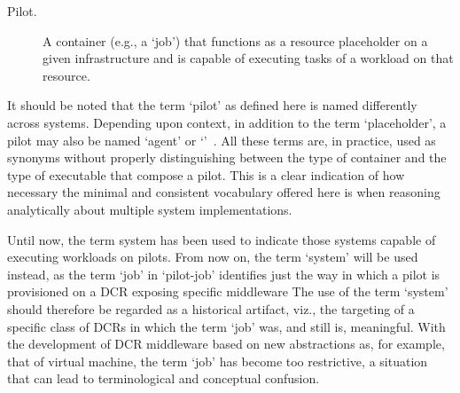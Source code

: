 \documentclass{sig-alternate}
\begin{document}

\begin{description}

\item[Pilot.] A container (e.g., a `job') that functions as a resource
placeholder on a given infrastructure and is capable of executing tasks of a
workload on that resource.

\end{description}

It should be noted that the term `pilot' as defined here is named differently
across \pilotjob systems. Depending upon context, in addition to the term
`placeholder', a pilot may also be named `agent' or
`\pilotjob'~\cite{moscicki2011,pinchak2002}. All these terms are, in practice,
used as synonyms without properly distinguishing between the type of container
and the type of executable that compose a pilot. This is a clear indication of
how necessary the minimal and consistent vocabulary offered here is when
reasoning analytically about multiple \pilotjob system implementations.

Until now, the term \pilotjob system has been used to indicate those systems
capable of executing workloads on pilots. From now on, the term `\pilot system'
will be used instead, as the term `job' in `pilot-job' identifies just the way
in which a pilot is provisioned on a DCR exposing specific middleware
The use of the term `\pilotjob system' should therefore be regarded as a
historical artifact, viz., the targeting of a specific class of DCRs in which
the term `job' was, and still is, meaningful. With the development of DCR
middleware based on new abstractions as, for example, that of virtual machine,
the term `job' has become too restrictive, a situation that can lead to
terminological and conceptual confusion.
\end{document}
